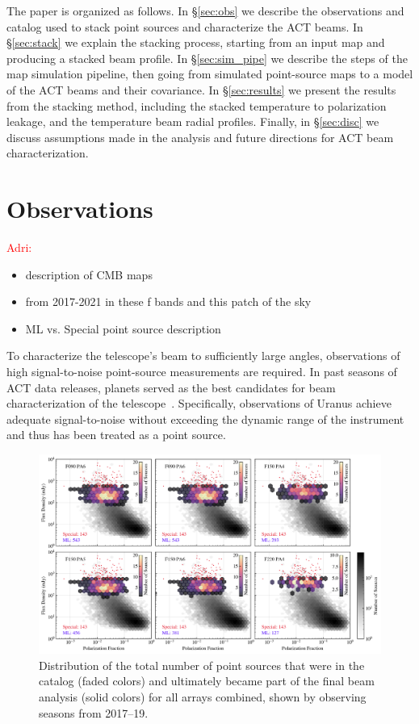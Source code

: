 The paper is organized as follows. 
In \S\ref{sec:obs} we describe the observations and catalog used to stack point sources and characterize the ACT beams.  In \S\ref{sec:stack} we explain the stacking process, starting from an input map and producing a stacked beam profile.  In \S\ref{sec:sim_pipe} we describe the steps of the map simulation pipeline, then going from simulated point-source maps to a model of the ACT beams and their covariance.  In \S\ref{sec:results} we present the results from the stacking method, including the stacked temperature to polarization leakage, and the temperature beam radial profiles.  Finally, in \S\ref{sec:disc} we discuss assumptions made in the analysis and future directions for ACT beam characterization.

\section{Observations}
\label{sec:observations}
\textcolor{red}{Adri:}
\label{sec:obs}
\begin{itemize}
    \item description of CMB maps
    \item from 2017-2021 in these f bands and this patch of the sky
    \item ML vs. Special point source description
\end{itemize}
To characterize the telescope's beam to sufficiently large angles, observations of high signal-to-noise point-source measurements are required.  In past seasons of ACT data releases, planets served as the best candidates for beam characterization of the telescope~\cite{Lungu_2022}.  Specifically, observations of Uranus achieve adequate signal-to-noise without exceeding the dynamic range of the instrument and thus has been treated as a point source.
\begin{figure}
\vspace{1em}
    \centering
    \includegraphics[width=\textwidth]{Figures/pt_src_dist.png}
    \caption{Distribution of the total number of point sources that were in the catalog (faded colors) and ultimately became part of the final beam analysis (solid colors) for all arrays combined, shown by observing seasons from 2017--19.
    }
    \label{fig:ptsrc_select}
    \vspace{1em}
\end{figure}
